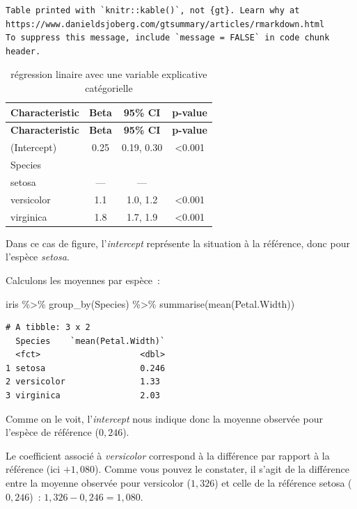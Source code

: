 \documentclass[
  letterpaper,
  DIV=11,
  numbers=noendperiod,
  oneside]{scrreprt}
\newenvironment{Shaded}{\begin{snugshade}}{\end{snugshade}}
\newcommand{\FunctionTok}[1]{\textcolor[rgb]{0.28,0.35,0.67}{#1}}
\newcommand{\NormalTok}[1]{\textcolor[rgb]{0.00,0.23,0.31}{#1}}
\newcommand{\SpecialCharTok}[1]{\textcolor[rgb]{0.37,0.37,0.37}{#1}}
\begin{document}
\begin{verbatim}
Table printed with `knitr::kable()`, not {gt}. Learn why at
https://www.danieldsjoberg.com/gtsummary/articles/rmarkdown.html
To suppress this message, include `message = FALSE` in code chunk header.
\end{verbatim}

\hypertarget{tbl-regression-lm-2}{}
\begin{longtable}[]{@{}lccc@{}}
\caption{\label{tbl-regression-lm-2}régression linaire avec une variable
explicative catégorielle}\tabularnewline
\toprule()
\textbf{Characteristic} & \textbf{Beta} & \textbf{95\% CI} &
\textbf{p-value} \\
\midrule()
\endfirsthead
\toprule()
\textbf{Characteristic} & \textbf{Beta} & \textbf{95\% CI} &
\textbf{p-value} \\
\midrule()
\endhead
(Intercept) & 0.25 & 0.19, 0.30 & \textless0.001 \\
Species & & & \\
setosa & --- & --- & \\
versicolor & 1.1 & 1.0, 1.2 & \textless0.001 \\
virginica & 1.8 & 1.7, 1.9 & \textless0.001 \\
\bottomrule()
\end{longtable}

Dans ce cas de figure, l'\emph{intercept} représente la situation à la
référence, donc pour l'espèce \emph{setosa}.

Calculons les moyennes par espèce~:

\begin{Shaded}
\begin{Highlighting}[]
\NormalTok{iris }\SpecialCharTok{\%\textgreater{}\%}
  \FunctionTok{group\_by}\NormalTok{(Species) }\SpecialCharTok{\%\textgreater{}\%}
  \FunctionTok{summarise}\NormalTok{(}\FunctionTok{mean}\NormalTok{(Petal.Width))}
\end{Highlighting}
\end{Shaded}

\begin{verbatim}
# A tibble: 3 x 2
  Species    `mean(Petal.Width)`
  <fct>                    <dbl>
1 setosa                   0.246
2 versicolor               1.33 
3 virginica                2.03 
\end{verbatim}

Comme on le voit, l'\emph{intercept} nous indique donc la moyenne
observée pour l'espèce de référence (\(0,246\)).

Le coefficient associé à \emph{versicolor} correspond à la différence
par rapport à la référence (ici \(+1,080\)). Comme vous pouvez le
constater, il s'agit de la différence entre la moyenne observée pour
versicolor (\(1,326\)) et celle de la référence setosa (\(0,246\))~:
\(1,326-0,246=1,080\).
\end{document}
